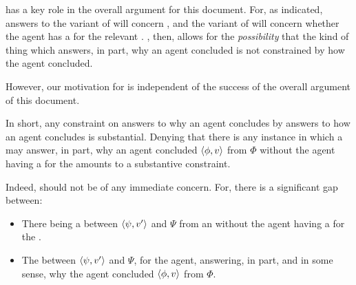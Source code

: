 \begin{note}
  \supportII{} has a key role in the overall argument for this document.
  For, as indicated, answers to the variant of \qWhy{} will concern \ros{}, and the variant of \qHow{} will concern whether the agent has a \wit{} for the relevant \ros{}.
  \supportII{}, then, allows for the \emph{possibility} that the kind of thing which answers, in part, why an agent concluded is not constrained by how the agent concluded.

  However, our motivation for \supportII{} is independent of the success of the overall argument of this document.

  In short, any constraint on answers to why an agent concludes by answers to how an agent concludes is substantial.
  Denying that there is any instance in which a \ros{} may answer, in part, why an agent concluded \(\langle \phi, v \rangle\) from \(\Phi\) without the agent having a \wit{} for the \ros{} amounts to a substantive constraint.

  Indeed, \supportII{} should not be of any immediate concern.
  For, there is a significant gap between:

  \begin{itemize}[noitemsep]
  \item
    There being a \ros{} between \(\langle \psi, v' \rangle\) and \(\Psi\) from an \agpe{} without the agent having a \wit{} for the \ros{}.
  \item
    The \ros{} between \(\langle \psi, v' \rangle\) and \(\Psi\), for the agent, answering, in part, and in some sense, why the agent concluded \(\langle \phi, v \rangle\) from \(\Phi\).
  \end{itemize}
\end{note}




